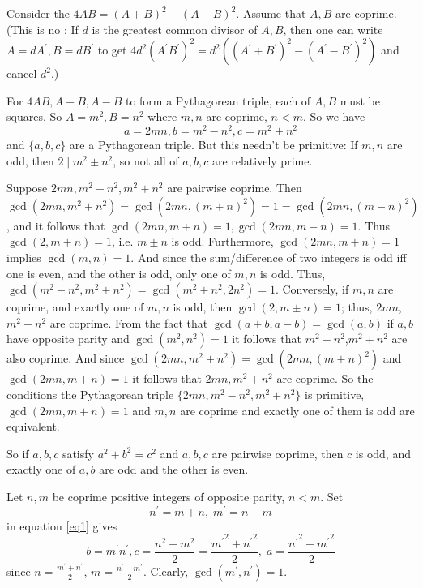 \documentclass[12pt]{article}
\begin{document}
Consider the  $4AB=(A+B)^2 -(A-B)^2$. Assume that $A,B$ are coprime. (This is no : If $d$ is the greatest common divisor of $A,B$, then one can write $A=dA^{'}, B=dB^{'}$ to get $4d^2(A^{'}B^{'})^2=d^2\left((A^{'}+B^{'})^2 -(A^{'} -B^{'})^2\right)$ and cancel $d^2$.)

For $4AB,A+B, A-B$ to form a Pythagorean triple, each of $A, B$ must be squares. So $A=m^2, B=n^2$ where $m,n$ are coprime, $n<m$. So we have
\begin{equation}
\label{eq1}
a=2mn, b=m^2-n^2, c=m^2+n^2
\end{equation}
and $\{a,b,c\}$ are a Pythagorean triple. But this needn't be primitive: If $m,n$ are odd, then $2 \mid m^2 \pm n^2$, so not all of $a,b,c$ are relatively prime. 

Suppose $2mn, m^2-n^2, m^2+n^2$ are pairwise coprime. Then $\gcd(2mn, m^2+n^2)=\gcd(2mn, (m+n)^2)=1=\gcd(2mn,(m-n)^2)$, and it follows that $\gcd(2mn,m+n)=1, \gcd(2mn,m-n)=1$. Thus $\gcd(2,m+n)=1$, i.e. $m \pm n$ is odd. Furthermore, $\gcd(2mn,m+n)=1$ implies $\gcd(m,n)=1$. And since the sum/difference of two integers is odd iff one is even, and the other is odd, only one of $m,n$ is odd. Thus, $\gcd(m^2-n^2,m^2+n^2)=\gcd(m^2+n^2,2n^2)=1$. Conversely, if $m,n$ are coprime, and exactly one of $m,n$ is odd, then $\gcd(2,m \pm n)=1$; thus, $2mn$,$m^2-n^2$ are coprime. From the fact that $\gcd(a+b, a-b)=\gcd(a,b)$ if $a,b$ have opposite parity and $\gcd(m^2,n^2)=1$ it follows that $m^2-n^2$,$m^2+n^2$ are also coprime. And since $\gcd(2mn,m^2+n^2)=\gcd(2mn,(m+n)^2)$ and $\gcd(2mn,m+n)=1$ it follows that $2mn,m^2+n^2$ are coprime. So the conditions the Pythagorean triple $\{2mn, m^2-n^2,m^2+n^2\}$ is primitive, $\gcd(2mn,m+n)=1$ and $m,n$ are coprime and exactly one of them is odd are equivalent.

So if $a,b,c$ satisfy $a^2+b^2=c^2$ and $a,b,c$ are pairwise coprime, then $c$ is odd, and exactly one of $a,b$ are odd and the other is even.

Let $n,m$ be coprime positive integers of opposite parity, $n<m$. Set
\begin{equation}
n^{'}=m+n, \; m^{'}=n-m
\end{equation}
in equation \ref{eq1}
gives
\begin{equation}
b=m^{'}n^{'}, c=\frac{n^2+m^2}{2}=\frac{\left.m^{'}\right.^2 +\left.n^{'}\right.^2}{2}, \;a=\frac{\left.n^{'}\right.^2-\left.m^{'}\right.^2}{2}
\end{equation}
since $n=\frac{m^{'}+n^{'}}{2}$, $m=\frac{n^{'}-m^{'}}{2}$. Clearly, $\gcd(m^{'},n^{'})=1$.
\end{document}
